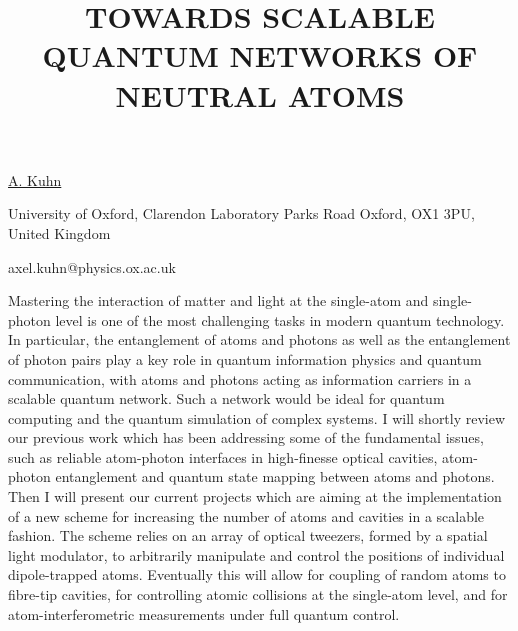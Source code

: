 \title{TOWARDS SCALABLE QUANTUM NETWORKS OF \mbox{NEUTRAL} ATOMS}

\underline{A. Kuhn} 

\vspace{-4mm}
{\normalsize{University of Oxford,
Clarendon Laboratory
Parks Road
Oxford, OX1 3PU,
United Kingdom

\email axel.kuhn@physics.ox.ac.uk}}

Mastering the interaction of matter and light at the single-atom and single-photon level is one of the most challenging tasks in
modern quantum technology. In particular, the entanglement of atoms and photons as well as the entanglement of photon pairs
play a key role in quantum information physics and quantum communication, with atoms and photons acting as information
carriers in a scalable quantum network. Such a network would be ideal for quantum computing and the quantum simulation of
complex systems.
I will shortly review our previous work which has been addressing some of the fundamental issues, such as reliable atom-photon
interfaces in high-finesse optical cavities, atom-photon entanglement and quantum state mapping between atoms and photons. Then I will present our current projects which are aiming at the implementation of a new scheme for increasing the number of
atoms and cavities in a scalable fashion. The scheme relies on an array of optical tweezers, formed by a spatial light modulator,
to arbitrarily manipulate and control the positions of individual dipole-trapped atoms. Eventually this will allow for coupling of random atoms to fibre-tip cavities, for controlling atomic collisions at the single-atom level, and for atom-interferometric
measurements under full quantum control.

\vspace{\baselineskip}